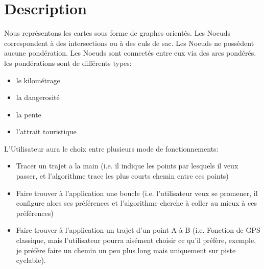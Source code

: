 \section{Description}
Nous représentons les cartes sous forme de graphes orientés.
Les Noeuds correspondent à des intersections ou à des culs de sac.
Les Noeuds ne possèdent aucune pondération.
Les Noeuds sont connectés entre eux via des arcs pondérés. les pondérations sont de différents
types:
\begin{itemize}
  \item le kilométrage
  \item la dangerosité
  \item la pente
  \item l'attrait touristique
\end{itemize}
L'Utilisateur aura le choix entre plusieurs mode de fonctionnements:
\begin{itemize}
  \item Tracer un trajet a la main (i.e. il indique les points par lesquels il veux passer, et l'algorithme trace les plus courts chemin entre ces points)
  \item Faire trouver à l'application une boucle (i.e. l'utilisateur veux se promener, il configure alors ses préférences et l'algorithme cherche à coller au mieux à ces préférences)
  \item Faire trouver à l'application un trajet d'un point A à B (i.e. Fonction de GPS classique, mais l'utilisateur pourra aisément choisir ce qu'il préfère, exemple, je préfère faire un chemin un peu plus long mais uniquement sur piste cyclable).
\end{itemize}

